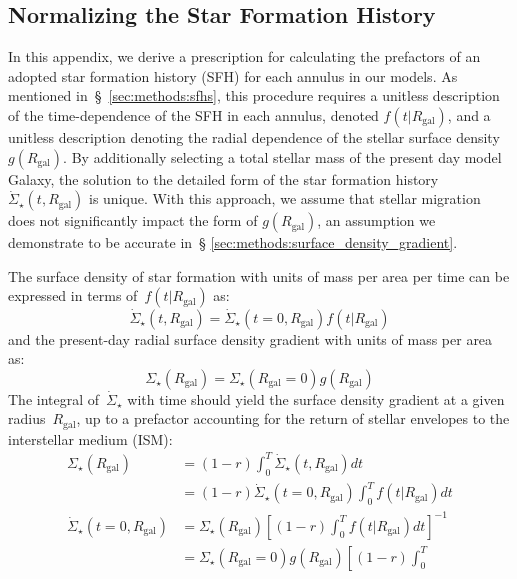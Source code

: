 \documentclass[fleqn, usenatbib]{mnras}
\begin{document}
\begin{appendices}
\section{Normalizing the Star Formation History} 
\label{sec:normalize_sfh} 
In this appendix, we derive a prescription for calculating the prefactors of an 
adopted star formation history (SFH) for each annulus in our models. As 
mentioned in~\S~\ref{sec:methods:sfhs}, this procedure requires a unitless 
description of the time-dependence of the SFH in each annulus, denoted 
$f(t|R_\text{gal})$, and a unitless description denoting the radial dependence 
of the stellar surface density~$g(R_\text{gal})$. By additionally selecting a 
total stellar mass of the present day model Galaxy, the solution to the 
detailed form of the star formation history 
$\dot{\Sigma}_\star(t, R_\text{gal})$ is unique. With this approach, we assume 
that stellar migration does not significantly impact the form of 
$g(R_\text{gal})$, an assumption we demonstrate to be accurate in~\S 
\ref{sec:methods:surface_density_gradient}. 
\par 
The surface density of star formation with units of mass per area per time can 
be expressed in terms of~$f(t|R_\text{gal})$ as: 
\begin{equation} 
\dot{\Sigma}_\star(t, R_\text{gal}) = \dot{\Sigma}_\star(t = 0, R_\text{gal}) 
f(t|R_\text{gal}) 
\label{eq:sfh_terms_of_f} 
\end{equation} 
and the present-day radial surface density gradient with units of mass per area 
as: 
\begin{equation} 
\Sigma_\star(R_\text{gal}) = \Sigma_\star(R_\text{gal} = 0) g(R_\text{gal}) 
\label{eq:sigma_terms_of_g}  
\end{equation} 
The integral of~$\dot{\Sigma}_\star$ with time should yield the surface density 
gradient at a given radius~$R_\text{gal}$, up to a prefactor accounting for the 
return of stellar envelopes to the interstellar medium (ISM): 
\begin{subequations}\begin{align} 
\Sigma_\star(R_\text{gal}) &= (1 - r)\int_0^T \dot{\Sigma}_\star(t, 
R_\text{gal}) dt 
\\ 
&= (1 - r) \dot{\Sigma}_\star(t = 0, R_\text{gal})\int_0^T f(t|R_\text{gal}) dt 
\\ 
\dot{\Sigma}_\star(t = 0, R_\text{gal}) &= \Sigma_\star(R_\text{gal}) 
\left[(1 - r) \int_0^T f(t|R_\text{gal})dt\right]^{-1} 
\\ 
&= \Sigma_\star(R_\text{gal} = 0)g(R_\text{gal}) \left[(1 - r) \int_0^T 

\end{align}
\end{subequations}
\end{appendices}
\end{document}
